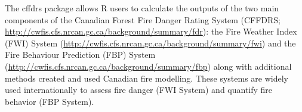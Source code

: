 \documentclass[a4paper]{book}
\begin{document}
%
\begin{Description}\relax
The cffdrs package allows R users to calculate the outputs of the two main
components of the Canadian Forest Fire Danger Rating System (CFFDRS;
\url{http://cwfis.cfs.nrcan.gc.ca/background/summary/fdr}): the Fire Weather
Index (FWI) System
(\url{http://cwfis.cfs.nrcan.gc.ca/background/summary/fwi}) and the Fire
Behaviour Prediction (FBP) System
(\url{http://cwfis.cfs.nrcan.gc.ca/background/summary/fbp}) along with
additional methods created and used Canadian fire modelling. These systems
are widely used internationally to assess fire danger (FWI System) and
quantify fire behavior (FBP System).
\end{Description}
%
\end{document}
